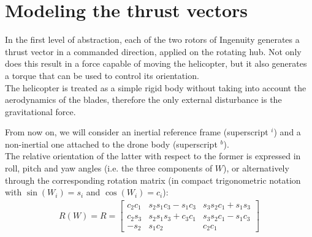 \section{Modeling the thrust vectors}
In the first level of abstraction, each of the two rotors of Ingenuity generates a thrust vector in a commanded direction, applied on the rotating hub. Not only does this result in a force capable of moving the helicopter, but it also generates a torque that can be used to control its orientation. \\The helicopter is treated as a simple rigid body without taking into account the aerodynamics of the blades, therefore the only external disturbance is the gravitational force. 

From now on, we will consider an inertial reference frame (superscript $^i$) and a non-inertial one attached to the drone body (superscript $^b$). \\ The relative orientation of the latter with respect to the former is expressed in roll, pitch and yaw angles (i.e. the three components of $W$), or alternatively through the corresponding rotation matrix (in compact trigonometric notation with $\sin(W_i) = s_i$ and $\cos(W_i) = c_i$):
\begin{align*}
    R(W) = R = \begin{bmatrix}
        c_2 c_1& s_2 s_1 c_3 - s_1 c_3 & s_3 s_2 c_1 + s_1 s_3 \\
        c_2 s_3 & s_2 s_1 s_3 + c_3 c_1 & s_3 s_2 c_1 - s_1 c_3 \\
        -s_2 & s_1 c_2 & c_2 c_1
    \end{bmatrix}
\end{align*}

